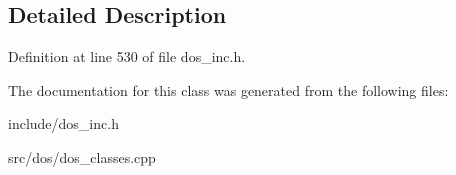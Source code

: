 \subsection{Detailed Description}


Definition at line 530 of file dos\-\_\-inc.\-h.



The documentation for this class was generated from the following files\-:\begin{DoxyCompactItemize}
\item 
include/dos\-\_\-inc.\-h\item 
src/dos/dos\-\_\-classes.\-cpp\end{DoxyCompactItemize}
